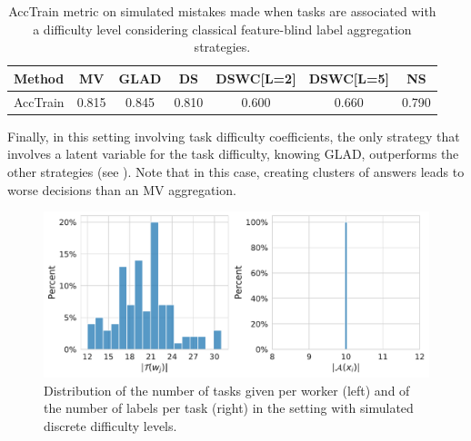 \begin{table}[htbp]
    \centering
    \caption{AccTrain metric on simulated mistakes made when tasks are associated with a difficulty level considering classical feature-blind label aggregation strategies.}
    \label{tab:accuracy_train_diff}
    \begin{tabular}{|l|c|c|c|c|c|c|}
    \hline
    \textbf{Method} & \textbf{MV} & \textbf{GLAD} & \textbf{DS} & \textbf{DSWC[L=2]} & \textbf{DSWC[L=5]} & \textbf{NS} \\
    \hline
    AccTrain & 0.815 &	0.845 &	0.810 &	0.600 &	0.660 &	0.790 \\
    \hline
    \end{tabular}
    \end{table}

Finally, in this setting involving task difficulty coefficients, the only strategy that involves a latent variable for the task difficulty, knowing GLAD, outperforms the other strategies (see ). Note that in this case, creating clusters of answers leads to worse decisions than an MV aggregation.

\begin{figure}[htbp]
    \centering
    \includegraphics[width=.8\textwidth]{./chapters/images_peerannot/cell-20-output-1.pdf}
    \caption{Distribution of the number of tasks given per worker (left) and of the number of labels per task (right) in the setting with simulated discrete difficulty levels.}
\end{figure}

